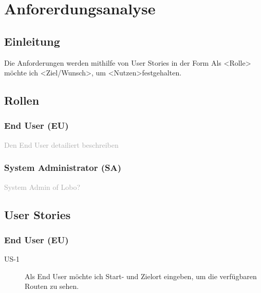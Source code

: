 \chapter{Anforerdungsanalyse}
\label{sec:anforderungsanalyse}


\section{Einleitung}
Die Anforderungen werden mithilfe von User Stories in der Form \glqq Als <Rolle> möchte ich <Ziel/Wunsch>, um <Nutzen>\grqq festgehalten.

\section{Rollen}
\subsection{End User (EU)}
\textcolor{darkgray}{
	Den End User detailiert beschreiben
}
\subsection{System Administrator (SA)}
\textcolor{darkgray}{
	System Admin of Lobo?
}

\section{User Stories}
\subsection{End User (EU)}

\begin{description}
\item[US-1] Als End User möchte ich Start- und Zielort eingeben, um die verfügbaren Routen zu sehen.
\end{description}

\begin{usecase}
\end{usecase}

